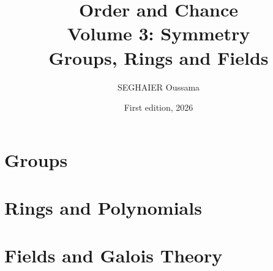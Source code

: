 \documentclass[11pt,openany]{book}
\title{\Huge\textbf{Order and Chance}\\[0.4em]\LARGE Volume 3: Symmetry\\[0.6em]
\Large Groups, Rings and Fields}
\author{SEGHAIER Oussama}
\date{First edition, 2026}
\begin{document}
\frontmatter
\makecover
\maketitle

\tableofcontents

\mainmatter

\part{Groups}





\part{Rings and Polynomials}



\part{Fields and Galois Theory}




\appendix







\end{document}
